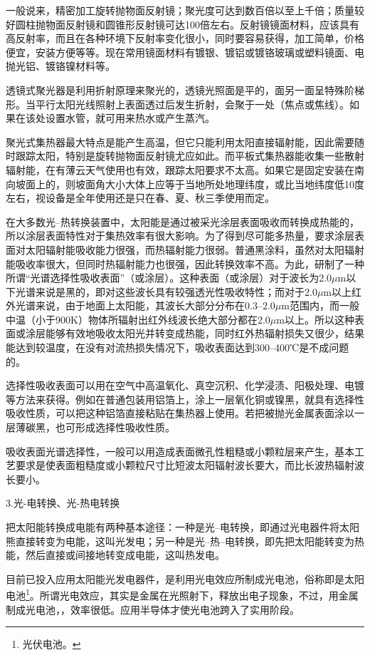 \documentclass{ctexbook}
\begin{document}
一般说来，精密加工旋转抛物面反射镜；聚光度可达到数百倍以至上千倍；质量较好圆柱抛物面反射镜和圆锥形反射镜可达100倍左右。反射镜镜面材料，应该具有高反射率，而且在各种环境下反射率变化很小，同时要容易获得，加工简单，价格便宜，安装方便等等。现在常用镜面材料有镀银、镀铝或镀铬玻璃或塑料镜面、电抛光铝、镀铬镍材料等。

透镜式聚光器是利用折射原理来聚光的，透镜光照面是平的，面另一面呈特殊阶梯形。当平行太阳光线照射上表面透过后发生折射，会聚于一处（焦点或焦线）。如果在该处设置水管，就可用来热水或产生蒸汽。

聚光式集热器最大特点是能产生高温，但它只能利用太阳直接辐射能，因此需要随时跟踪太阳，特别是旋转抛物面反射镜尤应如此。而平板式集热器能收集一些散射辐射能，在有薄云天气使用也有效，跟踪太阳要求不太高。如果它是固定安装在南向坡面上的，则坡面角大小大体上应等于当地所处地理纬度，或比当地纬度低10度左右，视设备是全年使用还是只在春、夏、秋三季使用而定。

在大多数光--热转换装置中，太阳能是通过被采光涂层表面吸收而转换成热能的，所以涂层表面特性对于集热效率有很大影响。为了得到尽可能多热量，要求涂层表面对太阳辐射能吸收能力很强，而热辐射能力很弱。普通黑涂料，虽然对太阳辐射能吸收率很大，但同时热辐射能力也很强，因此转换效率不高。为此，研制了一种所谓“光谱选择性吸收表面”（或涂层）。这种表面（或涂层）对于波长为2.0$\mu$m以下光谱来说是黑的，即对这些波长具有较强透光性吸收特性；而对于2.0$\mu$m以上红外光谱来说，由于地面上太阳能，其波长大部分分布在0.3--2.0$\mu$m范围内，而一般中温（小于900K）物体所辐射出红外线波长绝大部分都在2.0$\mu$m以上。所以这种表面或涂层能够有效地吸收太阳光并转变成热能，同时红外热辐射损失又很少，结果能达到较温度，在没有对流热损失情况下，吸收表面达到300--400℃是不成问题的。

选择性吸收表面可以用在空气中高温氧化、真空沉积、化学浸渍、阳极处理、电镀等方法来获得。例如在普通包装用铝箔上，涂上一层氧化铜或镍黑，就具有选择性吸收性质，可以把这种铝箔直接粘贴在集热器上使用。若把被抛光金属表面涂以一层薄碳黑，也可形成选择性吸收性质。

吸收表面光谱选择性，一般可以用造成表面微孔性粗糙或小颗粒层来产生，基本工艺要求是使表面粗糙度或小颗粒尺寸比短波太阳辐射波长要大，而比长波热辐射波长要小。

3.光-电转换、光-热电转换

把太阳能转换成电能有两种基本途径：一种是光--电转换，即通过光电器件将太阳熊直接转变为电能，这叫光发电；另一种是光--热--电转换，即先把太阳能转变为热能，然后直接或间接地转变成电能，这叫热发电。

目前已投入应用太阳能光发电器件，是利用光电效应所制成光电池，俗称即是太阳电池\footnote{光伏电池。}。所谓光电效应，其实是金属在光照射下，释放出电子现象，不过，用金属制成光电池，，效率很低。应用半导体才使光电池跨入了实用阶段。
\end{document}
